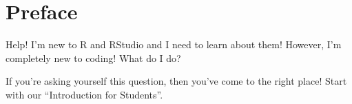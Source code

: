 \documentclass[
  letterpaper,
  DIV=11,
  numbers=noendperiod]{scrreprt}
\theoremstyle{definition}
\theoremstyle{remark}
\begin{document}

\hypertarget{preface}{%
\chapter*{Preface}\label{preface}}

Help! I'm new to R and RStudio and I need to learn about them! However,
I'm completely new to coding! What do I do?

\begin{figure}

\begin{minipage}[t]{0.31\linewidth}

{\centering 


\caption{}

}

\end{minipage}%
%
\begin{minipage}[t]{0.69\linewidth}

{\centering 


\caption{}

}

\end{minipage}%

\end{figure}

If you're asking yourself this question, then you've come to the right
place! Start with our ``Introduction for Students''.
\end{document}

